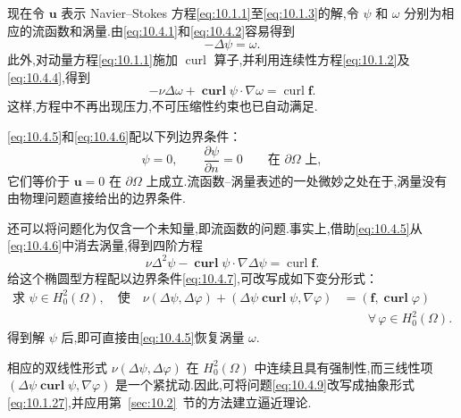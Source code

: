 现在令 \(\boldsymbol{u}\) 表示 Navier--Stokes 方程\eqref{eq:10.1.1}至\eqref{eq:10.1.3}的解,令 \(\psi\) 和 \(\omega\) 分别为相应的流函数和涡量.由\eqref{eq:10.4.1}和\eqref{eq:10.4.2}容易得到
\begin{equation}\label{eq:10.4.5}
  -\Delta\psi=\omega.
\end{equation}
此外,对动量方程\eqref{eq:10.1.1}施加 \(\operatorname{curl}\) 算子,并利用连续性方程\eqref{eq:10.1.2}及\eqref{eq:10.4.4},得到
\begin{equation}\label{eq:10.4.6}
  -\nu\Delta\omega+\operatorname{\mathbf{curl}}\psi\cdot\nabla\omega
        =\operatorname{curl}\boldsymbol{f}.
\end{equation}
这样,方程中不再出现压力,不可压缩性约束也已自动满足.

\eqref{eq:10.4.5}和\eqref{eq:10.4.6}配以下列边界条件：
\begin{equation}\label{eq:10.4.7}
  \psi=0,\qquad \frac{\partial\psi}{\partial n}=0
         \qquad\text{在 }\partial\Omega\text{ 上},
\end{equation}
它们等价于 \(\boldsymbol{u}=0\) 在 \(\partial\Omega\) 上成立.流函数--涡量表述的一处微妙之处在于,涡量没有由物理问题直接给出的边界条件.

还可以将问题化为仅含一个未知量,即流函数的问题.事实上,借助\eqref{eq:10.4.5}从\eqref{eq:10.4.6}中消去涡量,得到四阶方程
\begin{equation}\label{eq:10.4.8}
  \nu\Delta^2\psi-\operatorname{\mathbf{curl}}\psi\cdot\nabla\Delta\psi
        =\operatorname{curl}\boldsymbol{f}.
\end{equation}
给这个椭圆型方程配以边界条件\eqref{eq:10.4.7},可改写成如下变分形式：
\begin{equation}\label{eq:10.4.9}
  \begin{aligned}
    \text{求 }\psi\in H_0^2(\Omega),\quad\text{使}\quad
      \nu(\Delta\psi,\Delta\varphi)+(\Delta\psi\operatorname{\mathbf{curl}}\psi,\nabla\varphi)
         &=(\boldsymbol{f},\operatorname{\mathbf{curl}}\varphi)\\
         &\qquad\forall\,\varphi\in H_0^2(\Omega).
  \end{aligned}
\end{equation}
得到解 \(\psi\) 后,即可直接由\eqref{eq:10.4.5}恢复涡量 \(\omega\).

相应的双线性形式 \(\nu(\Delta\psi,\Delta\varphi)\) 在 \(H_0^2(\Omega)\) 中连续且具有强制性,而三线性项 \((\Delta\psi\operatorname{\mathbf{curl}}\psi,\nabla\varphi)\) 是一个紧扰动.因此,可将问题\eqref{eq:10.4.9}改写成抽象形式\eqref{eq:10.1.27},并应用第~\ref{sec:10.2}~节的方法建立逼近理论.

